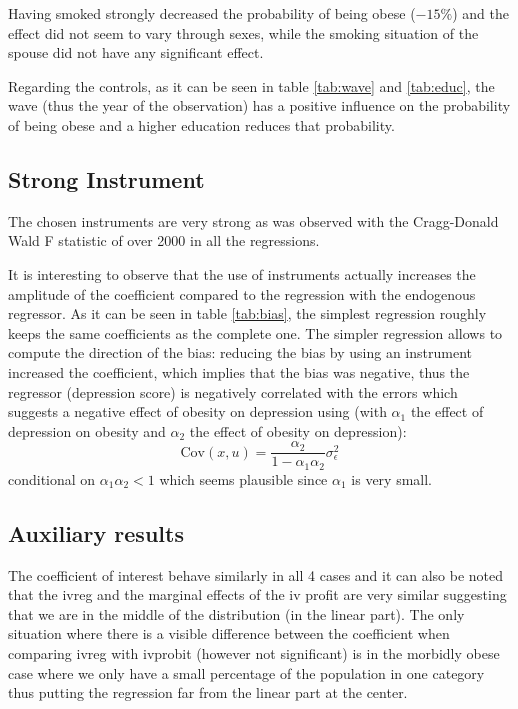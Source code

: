 Having smoked strongly decreased the probability of being obese ($-15\%$) and the effect did not seem to vary through sexes, while the smoking situation of the spouse did not have any significant effect.

Regarding the controls, as it can be seen in table \ref{tab:wave} and \ref{tab:educ}, the wave (thus the year of the observation) has a positive influence on the probability of being obese and a higher education reduces that probability.

\subsection{Strong Instrument}
The chosen instruments are very strong as was observed with the Cragg-Donald Wald F statistic of over 2000 in all the regressions.

It is interesting to observe that the use of instruments actually increases the amplitude of the coefficient compared to the regression with the endogenous regressor. As it can be seen in table \ref{tab:bias}, the simplest regression roughly keeps the same coefficients as the complete one. The simpler regression allows to compute the direction of the bias:  reducing the bias by using an instrument increased the coefficient, which implies that the bias was negative, thus the regressor (depression score) is negatively correlated with the errors which suggests a negative effect of obesity on depression using (with $\alpha_1$ the effect of depression on obesity and $\alpha_2$ the effect of obesity on depression):
\[
\text{Cov}(x, u) = \frac{\alpha_2}{1 - \alpha_1 \alpha_2} \sigma_\epsilon^2
\]
conditional on $\alpha_1 \alpha_2 < 1$ which seems plausible since $\alpha_1$ is very small.

\subsection{Auxiliary results}

The coefficient of interest behave similarly in all 4 cases and it can also be noted that the ivreg and the marginal effects of the iv profit are very similar suggesting that we are in the middle of the distribution (in the linear part). The only situation where there is a visible difference between the coefficient when comparing ivreg with ivprobit (however not significant) is in the morbidly obese case where we only have a small percentage of the population in one category thus putting the regression far from the linear part at the center.


